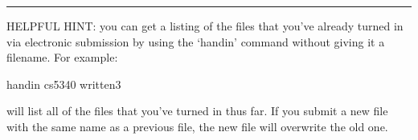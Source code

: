 \documentclass[11pt]{article}
\begin{document}
\vspace*{.2in}
\hrule
HELPFUL HINT: you can get a listing of the files  that you've already
turned in via electronic submission by using the `handin' command
without giving it a filename. For  example:
\begin{center}
handin cs5340 written3
\end{center}
will list all of the files that you've turned in thus far. 
If you submit a new file with the same name as a previous file, the
new file will overwrite the old one.  
\end{document}
